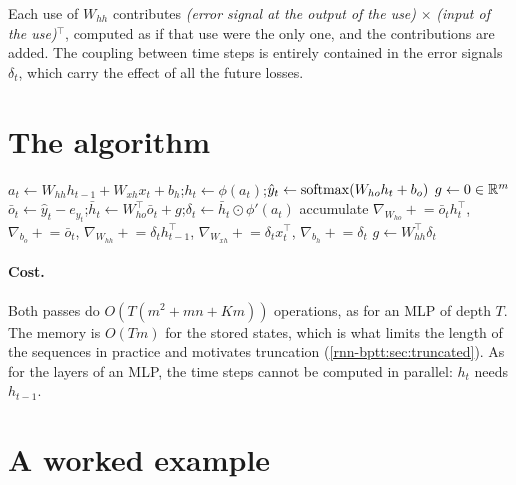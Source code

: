 \begin{notechapter}
\begin{keyidea}
Each use of $W_{hh}$ contributes \emph{(error signal at the output of the use)} $\times$ \emph{(input of the use)}$^\top$,
computed as if that use were the only one, and the contributions are added. The coupling
between time steps is entirely contained in the error signals $\delta_t$, which carry the effect of
all the future losses.
\end{keyidea}

\section{The algorithm}\label{rnn-bptt:sec:algorithm}

\begin{algorithm}[ht]
\caption{Backpropagation through time for one sequence}\label{rnn-bptt:alg:bptt}
\begin{algorithmic}[1]
 
  \State $a_t\gets W_{hh}h_{t-1} + W_{xh}x_t + b_h$;\quad $h_t\gets\phi(a_t)$;\quad $\hat y_t\gets\operatorname{softmax}(W_{ho}h_t + b_o)$
\EndFor
\State $g\gets 0\in\mathbb{R}^m$ 
 
  \State $\bar o_t\gets\hat y_t - e_{y_t}$;\quad $\bar h_t\gets W_{ho}^\top\bar o_t + g$;\quad $\delta_t\gets\bar h_t\odot\phi'(a_t)$
  \State accumulate $\nabla_{W_{ho}}\mathrel{+}=\bar o_th_t^\top$, $\nabla_{b_o}\mathrel{+}=\bar o_t$, $\nabla_{W_{hh}}\mathrel{+}=\delta_th_{t-1}^\top$, $\nabla_{W_{xh}}\mathrel{+}=\delta_tx_t^\top$, $\nabla_{b_h}\mathrel{+}=\delta_t$
  \State $g\gets W_{hh}^\top\delta_t$
\EndFor
\end{algorithmic}
\end{algorithm}

\paragraph{Cost.} Both passes do $O(T(m^2 + mn + Km))$ operations, as for an MLP of depth $T$. The memory is
$O(Tm)$ for the stored states, which is what limits the length of the sequences in practice and
motivates truncation (\cref{rnn-bptt:sec:truncated}). As for the layers of an MLP, the time steps
cannot be computed in parallel: $h_t$ needs $h_{t-1}$.

\section{A worked example}\label{rnn-bptt:sec:example}


\end{notechapter}
